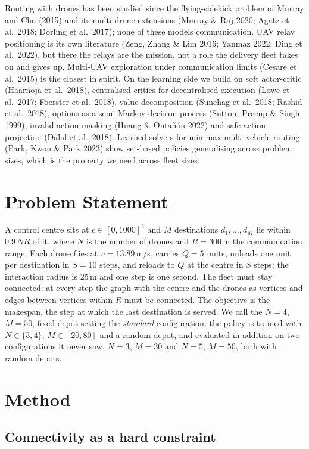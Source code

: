 \documentclass[12pt]{article}
\begin{document}
Routing with drones has been studied since the flying-sidekick problem of Murray and Chu (2015)
and its multi-drone extensions (Murray \& Raj 2020; Agatz et al.\ 2018; Dorling et al.\ 2017);
none of these models communication. UAV relay positioning is its own literature (Zeng, Zhang \&
Lim 2016; Yanmaz 2022; Ding et al.\ 2022), but there the relays are the mission, not a role the
delivery fleet takes on and gives up. Multi-UAV exploration under communication limits (Cesare
et al.\ 2015) is the closest in spirit. On the learning side we build on soft actor-critic
(Haarnoja et al.\ 2018), centralised critics for decentralised execution (Lowe et al.\ 2017;
Foerster et al.\ 2018), value decomposition (Sunehag et al.\ 2018; Rashid et al.\ 2018), options
as a semi-Markov decision process (Sutton, Precup \& Singh 1999), invalid-action masking (Huang
\& Onta\~{n}\'{o}n 2022) and safe-action projection (Dalal et al.\ 2018). Learned solvers for
min-max multi-vehicle routing (Park, Kwon \& Park 2023) show set-based policies generalising
across problem sizes, which is the property we need across fleet sizes.

\section{Problem Statement}

A control centre sits at $c \in [0,1000]^2$ and $M$ destinations $d_1,\dots,d_M$ lie within
$0.9\,N R$ of it, where $N$ is the number of drones and $R = 300$\,m the communication range.
Each drone flies at $v = 13.89$\,m/s, carries $Q = 5$ units, unloads one unit per destination in
$S = 10$ steps, and reloads to $Q$ at the centre in $S$ steps; the interaction radius is 25\,m
and one step is one second. The fleet must stay connected: at every step the graph with the
centre and the drones as vertices and edges between vertices within $R$ must be connected. The
objective is the makespan, the step at which the last destination is served. We call the
$N = 4$, $M = 50$, fixed-depot setting the \emph{standard} configuration; the policy is trained
with $N \in \{3,4\}$, $M \in [20,80]$ and a random depot, and evaluated in addition on two
configurations it never saw, $N = 3$, $M = 30$ and $N = 5$, $M = 50$, both with random depots.

\section{Method}

\subsection{Connectivity as a hard constraint}
\end{document}

